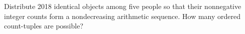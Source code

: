 Distribute 2018 identical objects among five people so that their nonnegative integer counts form a nondecreasing arithmetic sequence. How many ordered count-tuples are possible?
